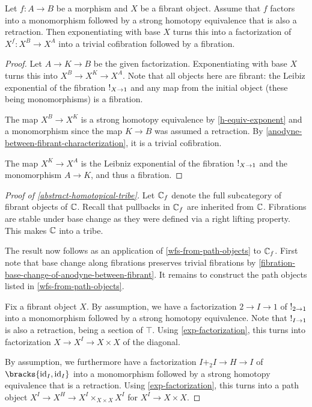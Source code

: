 \documentclass[reqno,10pt,a4paper,oneside]{amsart}
\begin{document}
\begin{lemma}
\label{exp-factorization}
Let $f : A \to B$ be a morphism and $X$ be a fibrant object.
Assume that $f$ factors into a monomorphism followed by a strong homotopy equivalence that is also a retraction.
Then exponentiating with base $X$ turns this into a factorization of $X^f : X^B \to X^A$ into a trivial cofibration followed by a fibration.
\end{lemma}

\begin{proof}
Let $A \to K \to B$ be the given factorization.
Exponentiating with base $X$ turns this into $X^B \to X^K \to X^A$.
Note that all objects here are fibrant: the Leibiz exponential of the fibration $\mathord{!}_{X \to 1}$ and any map from the initial object (these being monomorphisms) is a fibration.

The map $X^B \to X^K$ is a strong homotopy equivalence by \cref{h-equiv-exponent} and a monomorphism since the map $K \to B$ was assumed a retraction.
By \cref{anodyne-between-fibrant-characterization}, it is a trivial cofibration.

The map $X^K \to X^A$ is the Leibniz exponential of the fibration $\mathord{!}_{X \to 1}$ and the monomorphism $A \to K$, and thus a fibration.
\end{proof}

\begin{proof}[Proof of \cref{abstract-homotopical-tribe}]
Let $\mathbb{C}_f$ denote the full subcategory of fibrant objects of $\mathbb{C}$.
Recall that pullbacks in $\mathbb{C}_f$ are inherited from $\mathbb{C}$.
Fibrations are stable under base change as they were defined via a right lifting property.
This makes $\mathbb{C}$ into a tribe.

The result now follows as an application of \cref{wfs-from-path-objects} to $\mathbb{C}_f$.
First note that base change along fibrations preserves trivial fibrations by \cref{fibration-base-change-of-anodyne-between-fibrant}.
It remains to construct the path objects listed in \cref{wfs-from-path-objects}.

Fix a fibrant object $X$.
By assumption, we have a factorization $2 \to I \to 1$ of $\mathord{!}_{2 \to 1}$ into a monomorphism followed by a strong homotopy equivalence.
Note that $\mathord{!}_{I \to 1}$ is also a retraction, being a section of \eg $\top$.
Using \cref{exp-factorization}, this turns into factorization $X \to X^I \to X \times X$ of the diagonal.

By assumption, we furthermore have a factorization $I +_2 I \to H \to I$ of $\bracks{\id_I, \id_I}$ into a monomorphism followed by a strong homotopy equivalence that is a retraction.
Using \cref{exp-factorization}, this turns into a path object $X^I \to X^H \to X^I \times_{X \times X} X^I$ for $X^I \to X \times X$.
\end{proof}
\end{document}
